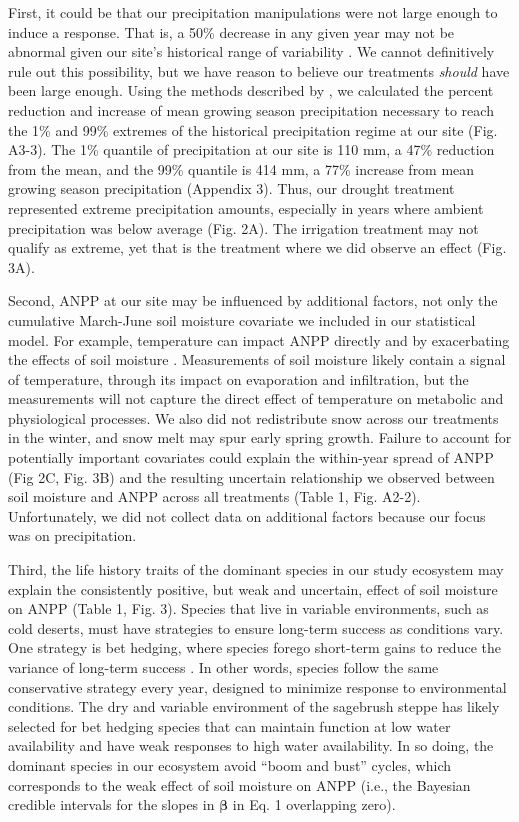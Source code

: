 \documentclass[fleqn,10pt,lineno]{wlpeerj} %
\begin{document}
First, it could be that our precipitation manipulations were not large
enough to induce a response. That is, a 50\% decrease in any given year
may not be abnormal given our site's historical range of variability
\citep{Knapp2017}. We cannot definitively rule out this possibility, but
we have reason to believe our treatments \emph{should} have been large
enough. Using the methods described by \citet{Lemoine2016}, we
calculated the percent reduction and increase of mean growing season
precipitation necessary to reach the 1\% and 99\% extremes of the
historical precipitation regime at our site (Fig. A3-3). The 1\%
quantile of precipitation at our site is 110 mm, a 47\% reduction from
the mean, and the 99\% quantile is 414 mm, a 77\% increase from mean
growing season precipitation (Appendix 3). Thus, our drought treatment
represented extreme precipitation amounts, especially in years where
ambient precipitation was below average (Fig. 2A). The irrigation
treatment may not qualify as extreme, yet that is the treatment where we
did observe an effect (Fig. 3A).

Second, ANPP at our site may be influenced by additional factors, not
only the cumulative March-June soil moisture covariate we included in
our statistical model. For example, temperature can impact ANPP directly
\citep{Epstein1997} and by exacerbating the effects of soil moisture
\citep{DeBoeck2011}. Measurements of soil moisture likely contain a
signal of temperature, through its impact on evaporation and
infiltration, but the measurements will not capture the direct effect of
temperature on metabolic and physiological processes. We also did not
redistribute snow across our treatments in the winter, and snow melt may
spur early spring growth. Failure to account for potentially important
covariates could explain the within-year spread of ANPP (Fig 2C, Fig.
3B) and the resulting uncertain relationship we observed between soil
moisture and ANPP across all treatments (Table 1, Fig. A2-2).
Unfortunately, we did not collect data on additional factors because our
focus was on precipitation.

Third, the life history traits of the dominant species in our study
ecosystem may explain the consistently positive, but weak and uncertain,
effect of soil moisture on ANPP (Table 1, Fig. 3). Species that live in
variable environments, such as cold deserts, must have strategies to
ensure long-term success as conditions vary. One strategy is bet
hedging, where species forego short-term gains to reduce the variance of
long-term success \citep{Seger1987}. In other words, species follow the
same conservative strategy every year, designed to minimize response to
environmental conditions. The dry and variable environment of the
sagebrush steppe has likely selected for bet hedging species that can
maintain function at low water availability and have weak responses to
high water availability. In so doing, the dominant species in our
ecosystem avoid ``boom and bust'' cycles, which corresponds to the weak
effect of soil moisture on ANPP (i.e., the Bayesian credible intervals
for the slopes in \(\boldsymbol{\beta}\) in Eq. 1 overlapping zero).
\end{document}
